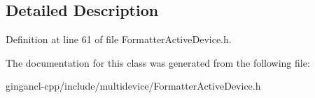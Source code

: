 \subsection{Detailed Description}




Definition at line 61 of file FormatterActiveDevice.h.

The documentation for this class was generated from the following file:\begin{CompactItemize}
\item 
gingancl-cpp/include/multidevice/FormatterActiveDevice.h\end{CompactItemize}

